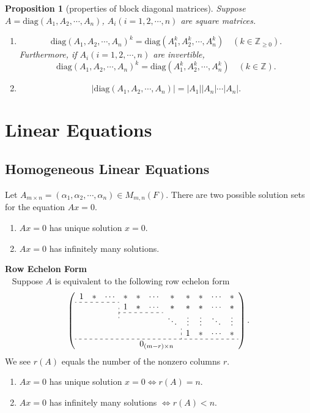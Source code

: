 \documentclass{report}
\newtheorem{proposition}{Proposition}[section]
\theoremstyle{nonumberplain}
\begin{document}
\begin{proposition}[properties of block diagonal matrices]
	Suppose $A=\mathrm{diag}(A_1,A_2,\cdots,A_n)$, $A_i(i=1,2,\cdots,n)$ are square matrices.
	\begin{enumerate}
		\item
		      \[
			      \mathrm{diag}(A_1,A_2,\cdots,A_n)^k=\mathrm{diag}(A_1^k,A_2^k,\cdots,A_n^k)\quad(k\in\mathbb{Z}_{\ge0}).
		      \]
		      Furthermore, if $A_i(i=1,2,\cdots,n)$ are invertible,
		      \[
			      \mathrm{diag}(A_1,A_2,\cdots,A_n)^k=\mathrm{diag}(A_1^k,A_2^k,\cdots,A_n^k)\quad(k\in\mathbb{Z}).
		      \]
		\item
		      \[
			      \left|\mathrm{diag}(A_1,A_2,\cdots,A_n)\right|=\left|A_1\right|\left|A_n\right|\cdots\left|A_n\right|.
		      \]
	\end{enumerate}
\end{proposition}



\section{Linear Equations}
\subsection{Homogeneous Linear Equations}
Let $A_{m\times n}=(\alpha_1,\alpha_2,\cdots,\alpha_n)\in M_{m,n}(F)$. There are two possible solution sets for the equation $Ax=0$.
\begin{enumerate}
	\item $Ax=0$ has unique solution $x=0$.
	\item $Ax=0$ has infinitely many solutions.
\end{enumerate}
\textbf{Row Echelon Form}\\~
Suppose $A$ is equivalent to the following row echelon form
\[
	\left(\begin{array}{ccccccccccc}
			1                              & *                                     & \cdots & *      & * & \cdots & *      & *      & *      & \cdots & *      \\\cdashline{1-3}[3pt/3pt]
			\multicolumn{3}{c;{3pt/3pt}}{} & 1                                     & *      & \cdots & * & *      & *      & \cdots & *                        \\\cdashline{4-6}[3pt/3pt]
			                               &                                       &        &        &   &        & \ddots & \vdots & \vdots & \ddots & \vdots \\
			\multicolumn{7}{c;{3pt/3pt}}{} & 1                                     & *      & \cdots & *                                                       \\\hdashline[3pt/3pt]
			                               & \multicolumn{9}{c}{0_{(m-r)\times n}} &
		\end{array}\right).
\]
We see $r(A)$ equals the number of the nonzero columns $r$.
\begin{enumerate}
	\item $Ax=0$ has unique solution $x=0\iff r(A)=n$.
	\item $Ax=0$ has infinitely many solutions $\iff r(A)<n$.
\end{enumerate}
\end{document}
